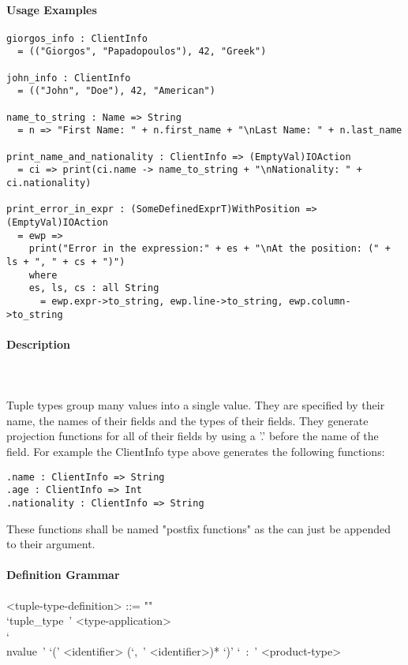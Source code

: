 \documentclass{article}
\def\pend{\mbox{} \\\\}
\begin{document}
\paragraph{Usage Examples}

\begin{verbatim}
giorgos_info : ClientInfo
  = (("Giorgos", "Papadopoulos"), 42, "Greek")

john_info : ClientInfo
  = (("John", "Doe"), 42, "American")

name_to_string : Name => String
  = n => "First Name: " + n.first_name + "\nLast Name: " + n.last_name

print_name_and_nationality : ClientInfo => (EmptyVal)IOAction
  = ci => print(ci.name -> name_to_string + "\nNationality: " + ci.nationality)

print_error_in_expr : (SomeDefinedExprT)WithPosition => (EmptyVal)IOAction
  = ewp =>
    print("Error in the expression:" + es + "\nAt the position: (" + ls + ", " + cs + ")")
    where
    es, ls, cs : all String
      = ewp.expr->to_string, ewp.line->to_string, ewp.column->to_string
\end{verbatim}

\paragraph{Description}\pend
Tuple types group many values into a single value. They are specified by their name,
the names of their fields and the types of their fields. They generate 
projection functions for all of their fields by using a '.' before the name of 
the field. For example the ClientInfo type above generates the following 
functions:
\begin{verbatim}
.name : ClientInfo => String
.age : ClientInfo => Int
.nationality : ClientInfo => String
\end{verbatim}
These functions shall be named "postfix functions" as the can just be appended to
their argument.

\paragraph{Definition Grammar}
\begin{grammar}
<tuple-type-definition> ::= ""\\
`tuple_type\ ' <type-application>
\\`\\nvalue\ ' `(' <identifier> (`,\ ' <identifier>)* `)' `\ :\ ' <product-type>
\end{grammar}
\end{document}
